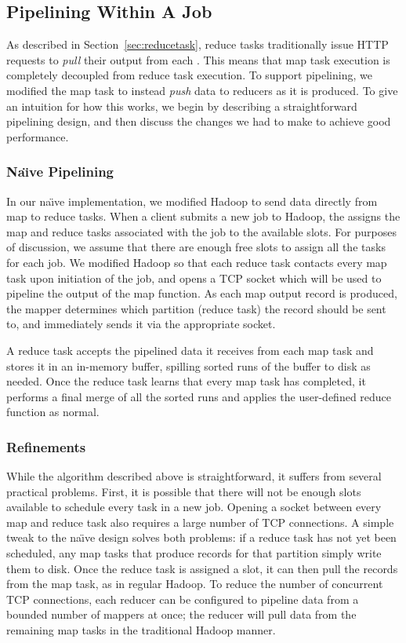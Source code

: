\subsection{Pipelining Within A Job}
\label{sec:intra-pipe}
As described in Section~\ref{sec:reducetask}, reduce tasks
traditionally issue HTTP requests to \emph{pull} their output from
each {\TT}. This means that map task execution is completely decoupled
from reduce task execution. To support pipelining, we modified the map
task to instead \emph{push} data to reducers as it is produced. To
give an intuition for how this works, we begin by describing a
straightforward pipelining design, and then discuss the changes we
had to make to achieve good performance.

\subsubsection{Na\"{\i}ve Pipelining}
\label{sec:naive}
In our na\"{\i}ve implementation, we modified Hadoop to send data directly from
map to reduce tasks. When a client submits a new job to Hadoop, the {\JT}
assigns the map and reduce tasks associated with the job to the available {\TT}
slots. For purposes of discussion, we assume that there are enough free slots to
assign all the tasks for each job. We modified Hadoop so that each reduce task
contacts every map task upon initiation of the job, and opens a TCP socket which
will be used to pipeline the output of the map function. As each map output
record is produced, the mapper determines which partition (reduce task) the
record should be sent to, and immediately sends it via the appropriate socket.

A reduce task accepts the pipelined data it receives from each map task and
stores it in an in-memory buffer, spilling sorted runs of the buffer to disk as
needed. Once the reduce task learns that every map task has completed, it
performs a final merge of all the sorted runs and applies the user-defined
reduce function as normal.

\subsubsection{Refinements}
\label{sec:pipe-refine}
While the algorithm described above is straightforward, it suffers
from several practical problems. First, it is possible that there will
not be enough slots available to schedule every task in a new
job. Opening a socket between every map and reduce task also requires
a large number of TCP connections. A simple tweak to the na\"{\i}ve
design solves both problems: if a reduce task has not yet been
scheduled, any map tasks that produce records for that partition
simply write them to disk. Once the reduce task is assigned a slot, it
can then pull the records from the map task, as in regular Hadoop.  To
reduce the number of concurrent TCP connections, each reducer can be
configured to pipeline data from a bounded number of mappers at once; the
reducer will pull data from the remaining map tasks in the traditional
Hadoop manner.


